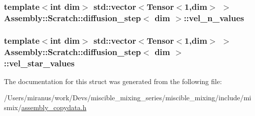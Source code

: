 \subsubsection[{vel\+\_\+n\+\_\+values}]{\setlength{\rightskip}{0pt plus 5cm}template$<$int dim$>$ std\+::vector$<$Tensor$<$1,dim$>$ $>$ {\bf Assembly\+::\+Scratch\+::diffusion\+\_\+step}$<$ dim $>$\+::vel\+\_\+n\+\_\+values}\label{struct_assembly_1_1_scratch_1_1diffusion__step_a3c69fd1c796447267c5e60b4574b7cd6}
\hypertarget{struct_assembly_1_1_scratch_1_1diffusion__step_a94cf958bf7072a08e34291f3b50f2a51}{}
\subsubsection[{vel\+\_\+star\+\_\+values}]{\setlength{\rightskip}{0pt plus 5cm}template$<$int dim$>$ std\+::vector$<$Tensor$<$1,dim$>$ $>$ {\bf Assembly\+::\+Scratch\+::diffusion\+\_\+step}$<$ dim $>$\+::vel\+\_\+star\+\_\+values}\label{struct_assembly_1_1_scratch_1_1diffusion__step_a94cf958bf7072a08e34291f3b50f2a51}


The documentation for this struct was generated from the following file\+:\begin{DoxyCompactItemize}
\item 
/\+Users/miranus/work/\+Devs/miscible\+\_\+mixing\+\_\+series/miscible\+\_\+mixing/include/mismix/\hyperlink{assembly__copydata_8h}{assembly\+\_\+copydata.\+h}\end{DoxyCompactItemize}
